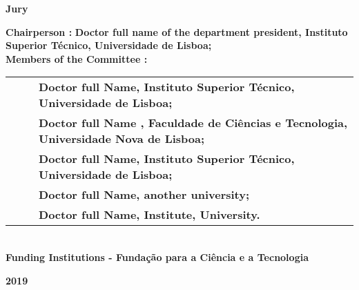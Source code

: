 \begin{flushleft}
\vspace{8mm}
\Large \textbf{Jury}\\
\vspace{2mm}
\raggedright\Large \textbf{Chairperson :}  \textbf{Doctor full name of the department president, Instituto Superior Técnico, Universidade de Lisboa;}\\
\Large \textbf{Members of the Committee :}\\ %
\vspace{2mm}
\begin{minipage}{\textwidth}
\begin{tabularx}{1.1\textwidth}{ l @{ } p{} }
~~~ & \textbf{Doctor full Name, Instituto Superior Técnico, Universidade de Lisboa;}\\
 & \textbf{Doctor full Name    , Faculdade de Ciências e Tecnologia, Universidade Nova de Lisboa;}\\
 & \textbf{Doctor full Name, Instituto Superior Técnico, Universidade de Lisboa;}\\
 & \textbf{Doctor full Name, another university;}\\
 & \textbf{Doctor full Name, Institute, University.}\\
\end{tabularx}
\end{minipage}\\
\centering
\vspace{5mm}\Large \textbf{Funding Institutions - Fundação para a Ciência e a Tecnologia}\\
%
\vspace{10mm}

\Large \textbf{2019} \\
\let\thepage\relax
\end{flushleft}
\pagebreak
